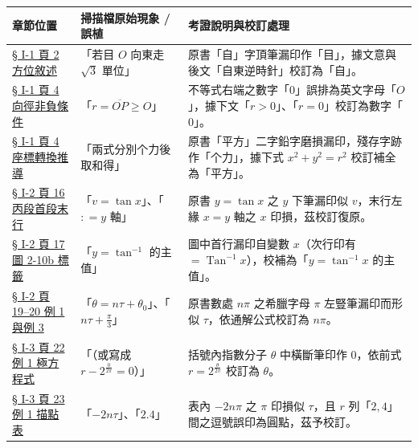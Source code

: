 \documentclass[a4paper,12pt,twoside]{article}
\begin{document}
\begin{table}[H]
\centering
\small
\renewcommand{\arraystretch}{1.35}
\begin{tabularx}{\textwidth}{|p{3.2cm}|p{3.8cm}|X|}
\hline
\textbf{章節位置} & \textbf{掃描檔原始現象 / 誤植} & \textbf{考證說明與校訂處理} \\ \hline

\hyperref[note:b5-ch1-p2-zi]{§ I-1 頁 2 方位敘述} & 
「若目 $O$ 向東走 $\sqrt{3}$ 單位」 & 
原書「自」字頂筆漏印作「目」，據文意與後文「自東逆時針」校訂為「自」。 \\ \hline

\hyperref[note:b5-ch1-p4-ge0]{§ I-1 頁 4 向徑非負條件} & 
「$r = \overline{OP} \ge O$」 & 
不等式右端之數字「$0$」誤排為英文字母「$O$」，據下文「$r > 0$」、「$r = 0$」校訂為數字「$0$」。 \\ \hline

\hyperref[note:b5-ch1-p4-pingfang]{§ I-1 頁 4 座標轉換推導} & 
「兩式分別个力後取和得」 & 
原書「平方」二字鉛字磨損漏印，殘存字跡作「个力」，據下式 $x^2+y^2=r^2$ 校訂補全為「平方」。 \\ \hline

\hyperref[note:b5-ch1-p16bottom]{§ I-2 頁 16 丙段首段末行} & 
「$v = \tan x$」、「$: = y$ 軸」 & 
原書 $y = \tan x$ 之 $y$ 下筆漏印似 $v$，末行左緣 $x = y$ 軸之 $x$ 印損，茲校訂復原。 \\ \hline

\hyperref[note:b5-ch1-fig2-10b]{§ I-2 頁 17 圖 2-10b 標籤} & 
「$y = \tan^{-1}$ 的主值」 & 
圖中首行漏印自變數 $x$（次行印有 $= \operatorname{Tan}^{-1} x$），校補為「$y = \tan^{-1} x$ 的主值」。 \\ \hline

\hyperref[note:b5-ch1-p19pi]{§ I-2 頁 19--20 例 1 與例 3} & 
「$\theta = n\tau + \theta_0$」、「$n\tau + \frac{\pi}{3}$」 & 
原書數處 $n\pi$ 之希臘字母 $\pi$ 左豎筆漏印而形似 $\tau$，依通解公式校訂為 $n\pi$。 \\ \hline

\hyperref[note:b5-ch1-p22-ex1]{§ I-3 頁 22 例 1 極方程式} & 
「（或寫成 $r - 2^{\frac{0}{2\pi}} = 0$）」 & 
括號內指數分子 $\theta$ 中橫斷筆印作 $0$，依前式 $r = 2^{\frac{\theta}{2\pi}}$ 校訂為 $\theta$。 \\ \hline

\hyperref[note:b5-ch1-p23-table]{§ I-3 頁 23 例 1 描點表} & 
「$-2n\tau$」、「$2.4$」 & 
表內 $-2n\pi$ 之 $\pi$ 印損似 $\tau$，且 $r$ 列「$2, 4$」間之逗號誤印為圓點，茲予校訂。 \\ \hline


\end{tabularx}
\end{table}
\end{document}
